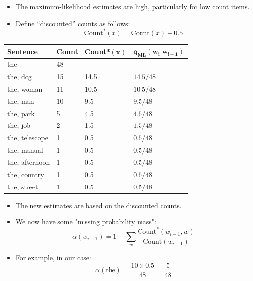\documentclass{book}
\begin{document}
\begin{itemize}
    \item The maximum-likelihood estimates are high, particularly for low count items.
   \item Define ``discounted'' counts as follows:
\begin{displaymath}
\text{Count}^*(x) =\text{Count}(x)-0.5
\end{displaymath}

\end{itemize}

\begin{table}[h]
    \centering
    \begin{tabular}{llll}
        \textbf{Sentence} & \textbf{Count} & \textbf{Count}*$\mathbf{(x)}$ & $\mathbf{q_{\text{ML}}(w_i | w_{i-1})}$ \\
        \hline
        the & 48 & & \\
        the, dog & 15 & 14.5 & $14.5/48$ \\
        the, woman & 11 & 10.5 & $10.5/48$ \\
        the, man & 10 & 9.5 & $9.5/48$ \\
        the, park & 5 & 4.5 & $4.5/48$ \\
        the, job & 2 & 1.5 & $1.5/48$ \\
        the, telescope & 1 & 0.5 & $0.5/48$ \\
        the, manual & 1 & 0.5 & $0.5/48$ \\
        the, afternoon & 1 & 0.5 & $0.5/48$ \\
        the, country & 1 & 0.5 & $0.5/48$ \\
        the, street & 1 & 0.5 & $0.5/48$ \\
    \end{tabular}
\end{table}

\begin{itemize}
    \item The new estimates are based on the discounted counts.
   \item We now have some "missing probability mass":
        \[
        \alpha(w_{i-1}) = 1 - \sum_{w} \frac{{\text{{Count}}^*(w_{i-1}, w)}}{{\text{{Count}}(w_{i-1})}}
        \]
        \item For example, in our case:
        \[
        \alpha(\text{{the}}) = \frac{{10 \times 0.5}}{{48}} = \frac{{5}}{{48}}
        \]
    \end{itemize}
\end{document}

